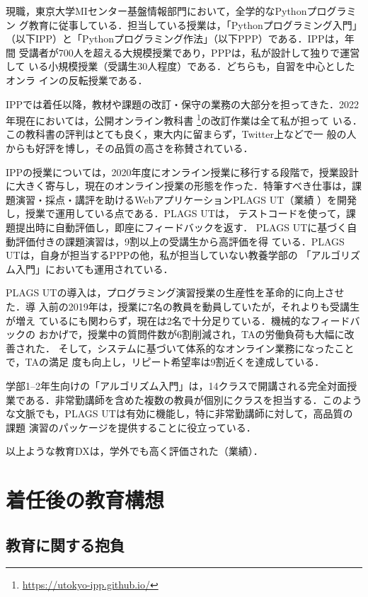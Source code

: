 \documentclass[dvipdfmx]{jsarticle}
\begin{document}
現職，東京大学MIセンター基盤情報部門において，全学的なPythonプログラミン
グ教育に従事している．担当している授業は，「Pythonプログラミング入門」
（以下IPP）と「Pythonプログラミング作法」（以下PPP）である．IPPは，年間
受講者が700人を超える大規模授業であり，PPPは，私が設計して独りで運営して
いる小規模授業（受講生30人程度）である．どちらも，自習を中心としたオンラ
インの反転授業である．

IPPでは着任以降，教材や課題の改訂・保守の業務の大部分を担ってきた．2022
年現在においては，公開オンライン教科書
\footnote{\url{https://utokyo-ipp.github.io/}}の改訂作業は全て私が担って
いる．この教科書の評判はとても良く，東大内に留まらず，Twitter上などで一
般の人からも好評を博し，その品質の高さを称賛されている．

IPPの授業については，2020年度にオンライン授業に移行する段階で，授業設計
に大きく寄与し，現在のオンライン授業の形態を作った．特筆すべき仕事は，課
題演習・採点・講評を助けるWebアプリケーションPLAGS UT（業績
\cite{ppl22:plags}）を開発し，授業で運用している点である．PLAGS UTは，
テストコードを使って，課題提出時に自動評価し，即座にフィードバックを返す．
PLAGS UTに基づく自動評価付きの課題演習は，9割以上の受講生から高評価を得
ている．PLAGS UTは，自身が担当するPPPの他，私が担当していない教養学部の
「アルゴリズム入門」においても運用されている．

PLAGS UTの導入は，プログラミング演習授業の生産性を革命的に向上させた．導
入前の2019年は，授業に7名の教員を動員していたが，それよりも受講生が増え
ているにも関わらず，現在は2名で十分足りている．機械的なフィードバックの
おかげで，授業中の質問件数が6割削減され，TAの労働負荷も大幅に改善された．
そして，システムに基づいて体系的なオンライン業務になったことで，TAの満足
度も向上し，リピート希望率は9割近くを達成している．

学部1--2年生向けの「アルゴリズム入門」は，14クラスで開講される完全対面授
業である．非常勤講師を含めた複数の教員が個別にクラスを担当する．このよう
な文脈でも，PLAGS UTは有効に機能し，特に非常勤講師に対して，高品質の課題
演習のパッケージを提供することに役立っている．

以上ような教育DXは，学外でも高く評価された（業績\cite{axies22:plags}）．

\section*{着任後の教育構想}

\subsection*{教育に関する抱負}
\end{document}
